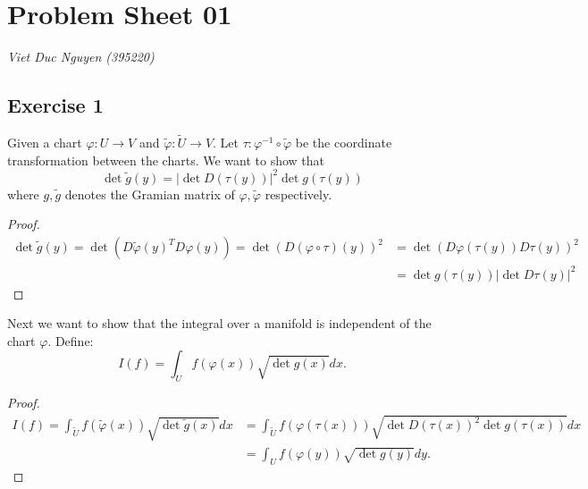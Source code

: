 \documentclass[a4paper]{article}
\renewcommand{\hline}{\noindent\makebox[\linewidth]{\rule{12cm}{1pt}}}
\begin{document}
\section*{Problem Sheet 01}
\textit{Viet Duc Nguyen (395220)}


\hline 

\subsection*{Exercise 1}

Given a chart $\varphi: U \to V$ and $\tilde \varphi: \tilde U \to V$. Let $\tau: \varphi^{-1} \circ \tilde \varphi$ be the coordinate transformation between the charts. We want to show that
\[
	\det \tilde g(y) = |\det D(\tau(y)) |^2 \det g(\tau(y))
\]
where $g, \tilde g$ denotes the Gramian matrix of $\varphi, \tilde \varphi$ respectively.

\begin{proof}
\begin{align*}
	\det \tilde g(y) = \det (D\tilde \varphi(y)^T D\varphi(y)) = \det ( D( \varphi \circ \tau)(y) )^2 &= \det(D \varphi(\tau(y)) D\tau(y))^2 \\
	&= \det g(\tau (y)) |\det D\tau(y)|^2
\end{align*}
\end{proof}

Next we want to show that the integral over a manifold is independent of the chart $\varphi$. Define:
\[
	I(f) = \int_U f(\varphi(x)) \sqrt{\det g(x)} dx.
\]

\begin{proof}
\begin{align*}
	I(f) = \int_{\tilde U}f(\tilde \varphi (x)) \sqrt{\det \tilde g(x)} dx &= \int_{\tilde U} f(\varphi(\tau(x))) \sqrt{\det D(\tau(x))^2 \det g(\tau(x))} dx \\
	&= \int_U f(\varphi(y)) \sqrt{\det g(y)} dy.
\end{align*}
\end{proof}
\end{document}
